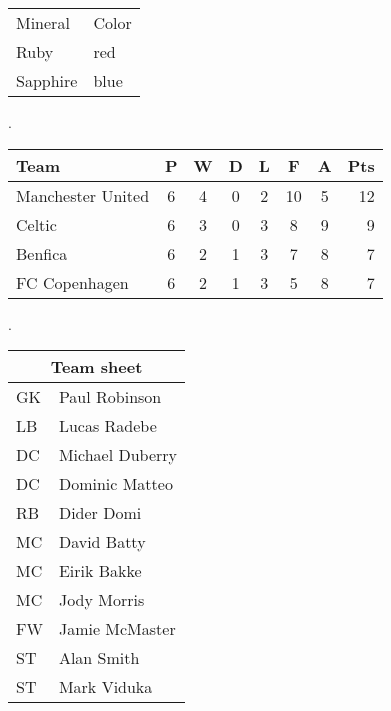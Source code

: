\documentclass{article}
\begin{document}
\begin{tabular}{ll}
\hline
Mineral & Color \\[1cm]
Ruby & red \\
Sapphire & blue \\
\hline
\end{tabular}




{
.\newline\newline\newline
}





\begin{tabular}{l*{6}{c}r}
Team              & P & W & D & L & F  & A & Pts \\
\hline
Manchester United & 6 & 4 & 0 & 2 & 10 & 5 & 12  \\
Celtic            & 6 & 3 & 0 & 3 &  8 & 9 &  9  \\
Benfica           & 6 & 2 & 1 & 3 &  7 & 8 &  7  \\
FC Copenhagen     & 6 & 2 & 1 & 3 &  5 & 8 &  7  \\
\end{tabular}





{
.\newline\newline\newline
}




\begin{tabular}{ |l|l| }
  \hline
  \multicolumn{2}{|c|}{Team sheet} \\
  \hline
  GK & Paul Robinson \\
  LB & Lucas Radebe \\
  DC & Michael Duberry \\
  DC & Dominic Matteo \\
  RB & Dider Domi \\
  MC & David Batty \\
  MC & Eirik Bakke \\
  MC & Jody Morris \\
  FW & Jamie McMaster \\
  ST & Alan Smith \\
  ST & Mark Viduka \\
  \hline
\end{tabular}
\end{document}
